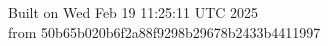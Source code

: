 {\noindent Built on Wed Feb 19 11:25:11 UTC 2025} \\ 
 {\noindent from 50b65b020b6f2a88f9298b29678b2433b4411997}
